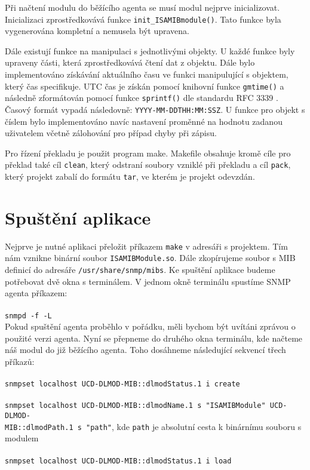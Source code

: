 \documentclass[a4paper,11pt]{article}
\begin{document}
		Při načtení modulu do běžícího agenta se musí modul nejprve inicializovat. Inicializaci zprostředkovává funkce \texttt{init\_ISAMIBmodule()}. Tato funkce byla vygenerována kompletní a nemusela být upravena.
		
		Dále existují funkce na manipulaci s jednotlivými objekty. U každé funkce byly upraveny části, která zprostředkovává čtení dat z objektu. Dále bylo implementováno získávání aktuálního času ve funkci manipulující s objektem, který čas specifikuje. UTC čas je získán pomocí knihovní funkce \texttt{gmtime()} a následně zformátován pomocí funkce \texttt{sprintf()} dle standardu RFC 3339 \cite{rfc}. Časový formát vypadá následovně: \texttt{YYYY-MM-DDTHH:MM:SSZ}. U funkce pro objekt s číslem bylo implementováno navíc nastavení proměnné na hodnotu zadanou uživatelem včetně zálohování pro případ chyby při zápisu. 
			
		Pro řízení překladu je použit program make. Makefile obsahuje kromě cíle pro překlad také cíl \texttt{clean}, který odstraní soubory vzniklé při překladu a cíl \texttt{pack}, který projekt zabalí do formátu \texttt{tar}, ve kterém je projekt odevzdán.
			
	\section{Spuštění aplikace}
		Nejprve je nutné aplikaci přeložit příkazem \texttt{make} v adresáři s projektem. Tím nám vznikne binární soubor \texttt{ISAMIBModule.so}. Dále zkopírujeme soubor s MIB definicí do adresáře \texttt{/usr/share/snmp/mibs}. Ke spuštění aplikace budeme potřebovat dvě okna s terminálem. V jednom okně terminálu spustíme SNMP agenta příkazem:\\\\
		\texttt{snmpd -f -L}\\
		
		Pokud spuštění agenta proběhlo v pořádku, měli bychom být uvítáni zprávou o použité verzi agenta. Nyní se přepneme do druhého okna terminálu, kde načteme náš modul do již běžícího agenta. Toho dosáhneme následující sekvencí třech příkazů:\\\\
		\texttt{snmpset localhost UCD-DLMOD-MIB::dlmodStatus.1 i create}\\\\
		\texttt{snmpset localhost UCD-DLMOD-MIB::dlmodName.1 s "ISAMIBModule"$ $ UCD-DLMOD-\\MIB::dlmodPath.1 s "path"}, kde \texttt{path} je absolutní cesta k binárnímu souboru s modulem\\\\
		\texttt{snmpset localhost UCD-DLMOD-MIB::dlmodStatus.1 i load}\\
		
\end{document}
